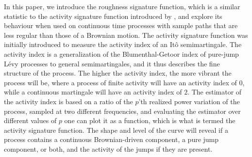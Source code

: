 \documentclass[fleqn,11pt,letterpaper]{article}
\theoremstyle{plain}
\theoremstyle{definition}
\theoremstyle{remark}
\numberwithin{equation}{section}
\begin{document}
In this paper, we introduce the roughness signature function, which is a similar statistic to the activity signature function introduced by \cite{Todorov2010}, and explore its behaviour when used on continuous time processes with sample paths that are less regular than those of a Brownian motion. The activity signature function was initially introduced to measure the activity index of an Itô semimartingale. The activity index is a generalization of the Blumenthal-Getoor index of pure-jump Lévy processes to general semimartingales, and it thus describes the fine structure of the process. The higher the activity index, the more vibrant the process will be, where a process of finite activity will have an activity index of $0$, while a continuous martingale will have an activity index of $2$. The estimator of the activity index is based on a ratio of the $p$'th realized power variation of the process, sampled at two different frequencies, and evaluating the estimator over different values of $p$ one can plot it as a function, which is what is termed the activity signature function. The shape and level of the curve will reveal if a process contains a continuous Brownian-driven component, a pure jump component, or both, and the activity of the jumps if they are present. 
\end{document}
